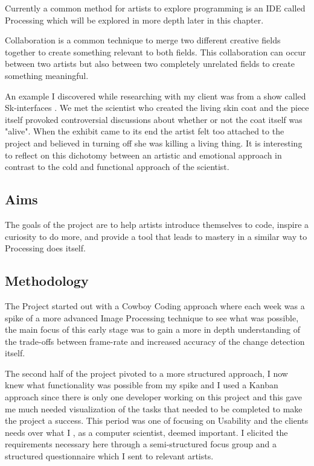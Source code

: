 \documentclass[a4paper]{report}
\begin{document}
Currently a common method for artists to explore programming is an IDE called Processing which will be explored in more depth later in this chapter.

Collaboration is a common technique to merge two different creative fields together to create something relevant to both fields. This collaboration can occur between two artists but also between two completely unrelated fields to create something meaningful. 

An example I discovered while researching with my client was from a show called Sk-interfaces \cite{SKIN}. We met the scientist who created the living skin coat and the piece itself provoked controversial discussions about whether or not the coat itself was "alive". When the exhibit came to its end the artist felt too attached to the project and believed in turning off she was killing a living thing. It is interesting to reflect on this dichotomy between an artistic and emotional approach in contrast to the cold and functional approach of the scientist.

\subsection{Aims}
The goals of the project are to help artists introduce themselves to code, inspire a curiosity to do more, and provide a tool that leads to mastery in a similar way to Processing\cite{PROCESSING} does itself.

\subsection{Methodology}
The Project started out with a Cowboy Coding approach where each week was a spike of a more advanced Image Processing technique to see what was possible, the main focus of this early stage was to gain a more in depth understanding of the trade-offs between frame-rate and increased accuracy of the change detection itself.

The second half of the project pivoted to a more structured approach, I now knew what functionality was possible from my spike and I used a Kanban\cite{KANBAN} approach since there is only one developer working on this project and this gave me much needed visualization of the tasks that needed to be completed to make the project a success. This period was one of focusing on Usability and the clients needs over what I , as a computer scientist, deemed important. I elicited the requirements necessary here through a semi-structured focus group and a structured questionnaire which I sent to relevant artists.
\end{document}
